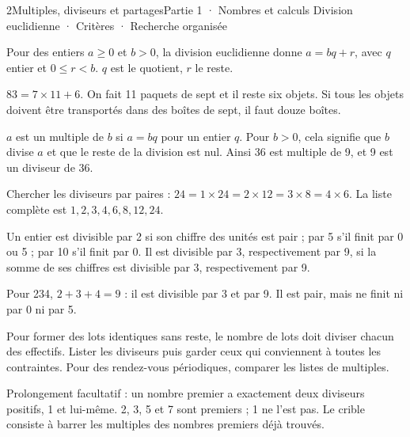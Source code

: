 \begin{ouverture}[calcul]{2}{Multiples, diviseurs et partages}{Partie 1 · Nombres et calculs}
{Division euclidienne · Critères · Recherche organisée}
\end{ouverture}
\pagestyle{otMain}\essentiel\fontsize{11}{15}\selectfont
{}\label{cours-2-1}
\begin{definition}Pour des entiers $a\ge0$ et $b>0$, la division euclidienne donne $a=bq+r$, avec $q$ entier et $0\le r<b$. $q$ est le quotient, $r$ le reste.\end{definition}
\begin{exemple}$83=7\times11+6$. On fait 11 paquets de sept et il reste six objets. Si tous les objets doivent être transportés dans des boîtes de sept, il faut douze boîtes.\end{exemple}
\begin{definition}$a$ est un multiple de $b$ si $a=bq$ pour un entier $q$. Pour $b>0$, cela signifie que $b$ divise $a$ et que le reste de la division est nul. Ainsi 36 est multiple de 9, et 9 est un diviseur de 36.\end{definition}
\begin{savoirfaire}Chercher les diviseurs par paires : $24=1\times24=2\times12=3\times8=4\times6$. La liste complète est $1,2,3,4,6,8,12,24$.\end{savoirfaire}
\clearpage
{}\label{cours-2-2}
\begin{propriete}Un entier est divisible par 2 si son chiffre des unités est pair ; par 5 s’il finit par 0 ou 5 ; par 10 s’il finit par 0. Il est divisible par 3, respectivement par 9, si la somme de ses chiffres est divisible par 3, respectivement par 9.\end{propriete}
\begin{exemple}Pour 234, $2+3+4=9$ : il est divisible par 3 et par 9. Il est pair, mais ne finit ni par 0 ni par 5.\end{exemple}
\begin{savoirfaire}Pour former des lots identiques sans reste, le nombre de lots doit diviser chacun des effectifs. Lister les diviseurs puis garder ceux qui conviennent à toutes les contraintes. Pour des rendez-vous périodiques, comparer les listes de multiples.\end{savoirfaire}
\begin{definition}Prolongement facultatif : un nombre premier a exactement deux diviseurs positifs, 1 et lui-même. 2, 3, 5 et 7 sont premiers ; 1 ne l’est pas. Le crible consiste à barrer les multiples des nombres premiers déjà trouvés.\end{definition}

